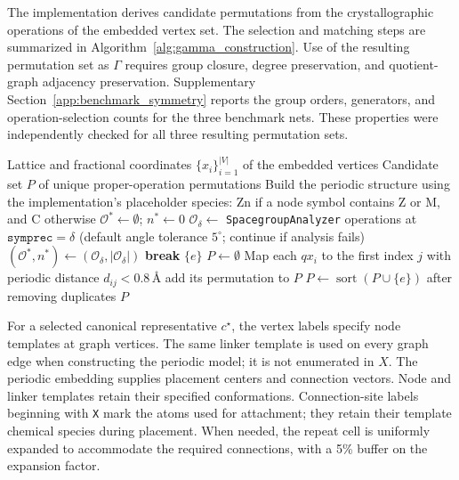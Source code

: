 \documentclass[a5paper, 10pt]{article}
\begin{document}
The implementation derives candidate permutations from the crystallographic operations of the embedded vertex set. The selection and matching steps are summarized in Algorithm~\ref{alg:gamma_construction}. Use of the resulting permutation set as $\Gamma$ requires group closure, degree preservation, and quotient-graph adjacency preservation. Supplementary Section~\ref{app:benchmark_symmetry} reports the group orders, generators, and operation-selection counts for the three benchmark nets. These properties were independently checked for all three resulting permutation sets.

\begin{algorithm}[htbp]
\caption{Numerical generation of candidate embedded-net permutations}
\label{alg:gamma_construction}
\scriptsize
\begin{algorithmic}[1]
\Require Lattice and fractional coordinates $\{x_i\}_{i=1}^{|V|}$ of the embedded vertices
\Ensure Candidate set $P$ of unique proper-operation permutations
\State Build the periodic structure using the implementation's placeholder species: Zn if a node symbol contains Z or M, and C otherwise
\State $\mathcal{O}^*\gets\emptyset$; $n^*\gets0$
    \State $\mathcal{O}_{\delta}\gets$ \texttt{SpacegroupAnalyzer} operations at $\texttt{symprec}=\delta$ (default angle tolerance $5^\circ$; continue if analysis fails)
        \State $(\mathcal{O}^*,n^*)\gets(\mathcal{O}_{\delta},|\mathcal{O}_{\delta}|)$
    \EndIf
     \State \textbf{break} \EndIf
\EndFor
{} \State \Return $\{e\}$ \EndIf
\State $P\gets\emptyset$
    \State Map each $q x_i$ to the first index $j$ with periodic distance $d_{ij}<0.8\,\text{\AA}$
     \State add its permutation to $P$ \EndIf
\EndFor
\State $P\gets\operatorname{sort}(P\cup\{e\})$ after removing duplicates
\State \Return $P$
\end{algorithmic}
\end{algorithm}

For a selected canonical representative $c^\star$, the vertex labels specify node templates at graph vertices. The same linker template is used on every graph edge when constructing the periodic model; it is not enumerated in $X$. The periodic embedding supplies placement centers and connection vectors. Node and linker templates retain their specified conformations. Connection-site labels beginning with \texttt{X} mark the atoms used for attachment; they retain their template chemical species during placement. When needed, the repeat cell is uniformly expanded to accommodate the required connections, with a 5\% buffer on the expansion factor.
\end{document}
